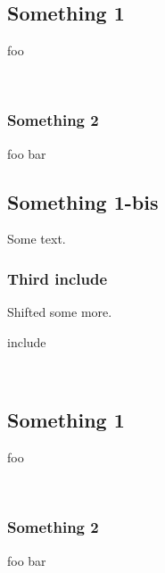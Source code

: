 \subsection{Something 1\label{something-1}}%
foo

\label{page-test+u+package+++ml-module-Include+u+sections-val-foo}\\
\subsubsection{Something 2\label{something-2}}%
\label{page-test+u+package+++ml-module-Include+u+sections-val-bar}\begin{ocamlindent}foo bar\end{ocamlindent}%
\medbreak
\subsection{Something 1-bis\label{something-1-bis}}%
Some text.

\subsubsection{Third include\label{third-include}}%
Shifted some more.

\begin{keyword}include\end{keyword}
 \hyperref[page-test+u+package+++ml-module-Include+u+sections-module-type-Something]{}\label{page-test+u+package+++ml-module-Include+u+sections-val-something}\\
\subsection{Something 1\label{something-1}}%
foo

\label{page-test+u+package+++ml-module-Include+u+sections-val-foo}\\
\subsubsection{Something 2\label{something-2}}%
\label{page-test+u+package+++ml-module-Include+u+sections-val-bar}\begin{ocamlindent}foo bar\end{ocamlindent}%
\medbreak

